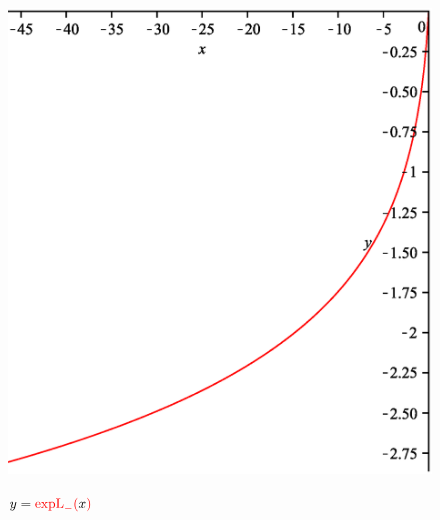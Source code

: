 \documentclass[12pt,reqno,intlimits,twoside]{amsart}
\DeclareMathOperator{\expL}{expL}%
\begin{document}
\newpage

\begin{figure}[!h]
  \includegraphics{ExpLinNeg}\\
  \caption{$y=\textcolor{red}{\expL_-(}x\textcolor{red}{)}$}\label{FigExpLinNeg}
\end{figure}
\end{document}
